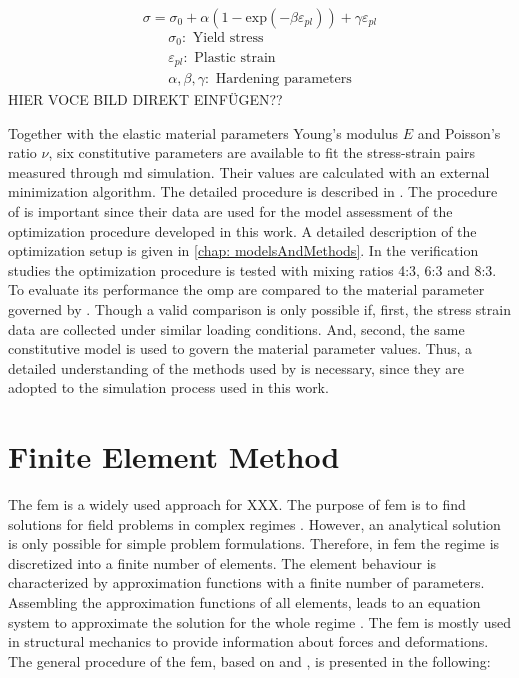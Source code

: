 \begin{equation} \label{eq: voce}
    \sigma = \sigma_0 + \alpha(1 - \text{exp}(-\beta \varepsilon_{pl})) + \gamma \varepsilon_{pl}
\end{equation}
\begin{gather*}
    \sigma_0: \text{ Yield stress} \\
    \varepsilon_{pl}: \text{ Plastic strain} \\
    \alpha, \beta,  \gamma: \text{ Hardening parameters}
\end{gather*}
HIER VOCE BILD DIREKT EINFÜGEN??

Together with the elastic material parameters Young's modulus $E$ and Poisson's ratio $\nu$, six constitutive parameters are available to fit the stress-strain pairs measured through \acrshort{md} simulation. Their values are calculated with an external minimization algorithm. The detailed procedure is described in \cite{ries_deciphering_nodate}. The procedure of \citet{ries_deciphering_nodate} is important since their data are used for the model assessment of the optimization procedure developed in this work. A detailed description of the optimization setup is given in \autoref{chap: modelsAndMethods}. In the verification studies the optimization procedure is tested with mixing ratios 4:3, 6:3 and 8:3. To evaluate its performance the \acrlong{omp} are compared to the material parameter governed by \citet{ries_deciphering_nodate}. Though a valid comparison is only possible if, first, the stress strain data are collected under similar loading conditions. And, second, the same constitutive model is used to govern the material parameter values. Thus, a detailed understanding of the methods used by \citet{ries_deciphering_nodate} is necessary, since they are adopted to the simulation process used in this work.  



\section{Finite Element Method} \label{sec: FEMBasics}

The \acrfull{fem} is a widely used approach for XXX. 
The purpose of \acrshort{fem} is to find solutions for field problems in complex regimes \cite{willner_vorlesungsskript_nodate}. However, an analytical solution is only possible for simple problem formulations. Therefore, in \acrshort{fem} the regime is discretized into a finite number of elements. The element behaviour is characterized by approximation functions with a finite number of parameters. Assembling the approximation functions of all elements, leads to an equation system to approximate the solution for the whole regime \cite{jagota_finite_nodate}. The \acrshort{fem} is mostly used in structural mechanics to provide information about forces and deformations. The general procedure of the \acrshort{fem}, based on \citet{willner_vorlesungsskript_nodate} and \citet{steinke_finite-elemente-methode_2015}, is presented in the following: \\

